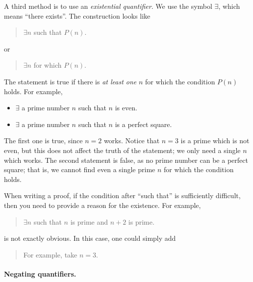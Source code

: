 \documentclass{tufte-book}
\begin{document}
A third method is to use an \emph{existential quantifier}. We use the symbol $\exists$, which means ``there exists''. The construction looks like
\begin{quote}
  $\exists n$ such that $P(n)$. 
\end{quote}
or
\begin{quote}
  $\exists n$ for which $P(n)$.
\end{quote}
The statement is true if there is \emph{at least one} $n$ for which the condition $P(n)$ holds. For example,
\begin{itemize}
    \item $\exists$ a prime number $n$ such that $n$ is even. 
    \item $\exists$ a prime number $n$ such that $n$ is a perfect square.
\end{itemize}
The first one is true, since $n = 2$ works. Notice that $n = 3$ is a prime which is not even, but this does not affect the truth of the statement; we only need a single $n$ which works. The second statement is false, as no prime number can be a perfect square; that is, we cannot find even a single prime $n$ for which the condition holds.

When writing a proof, if the condition after ``such that'' is sufficiently difficult, then you need to provide a reason for the existence. For example,
\begin{quote}
  $\exists n$ such that $n$ is prime and $n + 2$ is prime.
\end{quote}
is not exactly obvious. In this case, one could simply add
\begin{quote}
  For example, take $n = 3$.
\end{quote}




\paragraph{Negating quantifiers.}
\label{sec:negat-quant}
\end{document}
